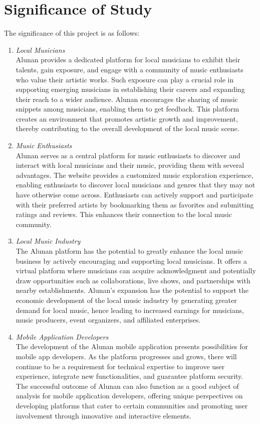 \section{Significance of Study}
The significance of this project is as follows:
\begin{enumerate}[1.]
    \item \textit{Local Musicians} \\
    Alunan provides a dedicated platform for local musicians to exhibit their talents, gain exposure, and engage with a community of music enthusiasts who value their artistic works. Such exposure can play a crucial role in supporting emerging musicians in establishing their careers and expanding their reach to a wider audience. Alunan encourages the sharing of music snippets among musicians, enabling them to get feedback. This platform creates an environment that promotes artistic growth and improvement, thereby contributing to the overall development of the local music scene.
    \item \textit{Music Enthusiasts} \\
    Alunan serves as a central platform for music enthusiasts to discover and interact with local musicians and their music, providing them with several advantages. The website provides a customized music exploration experience, enabling enthusiasts to discover local musicians and genres that they may not have otherwise come across. Enthusiasts can actively support and participate with their preferred artists by bookmarking them as favorites and submitting ratings and reviews. This enhances their connection to the local music community.
    \item \textit{Local Music Industry} \\
    The Alunan platform has the potential to greatly enhance the local music business by actively encouraging and supporting local musicians. It offers a virtual platform where musicians can acquire acknowledgment and potentially draw opportunities such as collaborations, live shows, and partnerships with nearby establishments. Alunan's expansion has the potential to support the economic development of the local music industry by generating greater demand for local music, hence leading to increased earnings for musicians, music producers, event organizers, and affiliated enterprises.
    \item \textit{Mobile Application Developers} \\
    The development of the Alunan mobile application presents possibilities for mobile app developers. As the platform progresses and grows, there will continue to be a requirement for technical expertise to improve user experience, integrate new functionalities, and guarantee platform security. The successful outcome of Alunan can also function as a good subject of analysis for mobile application developers, offering unique perspectives on developing platforms that cater to certain communities and promoting user involvement through innovative and interactive elements.
\end{enumerate}

